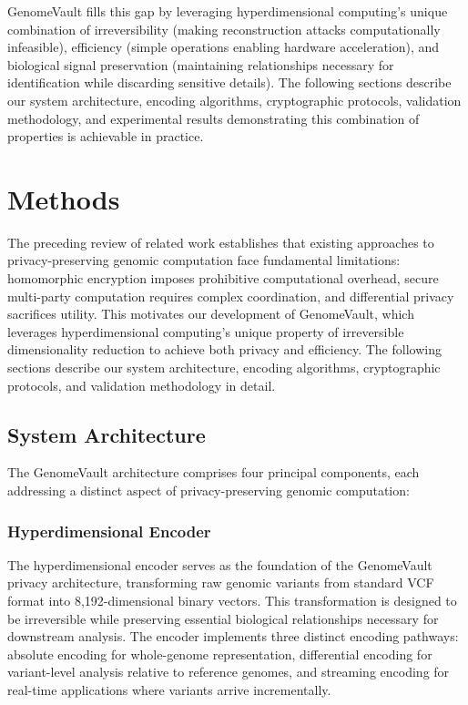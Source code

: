 \documentclass[11pt,letterpaper]{article}
\begin{document}
GenomeVault fills this gap by leveraging hyperdimensional computing's unique combination of irreversibility (making reconstruction attacks computationally infeasible), efficiency (simple operations enabling hardware acceleration), and biological signal preservation (maintaining relationships necessary for identification while discarding sensitive details). The following sections describe our system architecture, encoding algorithms, cryptographic protocols, validation methodology, and experimental results demonstrating this combination of properties is achievable in practice.

\section{Methods}
\label{sec:methods}

The preceding review of related work establishes that existing approaches to privacy-preserving genomic computation face fundamental limitations: homomorphic encryption imposes prohibitive computational overhead, secure multi-party computation requires complex coordination, and differential privacy sacrifices utility. This motivates our development of GenomeVault, which leverages hyperdimensional computing's unique property of irreversible dimensionality reduction to achieve both privacy and efficiency. The following sections describe our system architecture, encoding algorithms, cryptographic protocols, and validation methodology in detail.

\subsection{System Architecture}

The GenomeVault architecture comprises four principal components, each addressing a distinct aspect of privacy-preserving genomic computation:

\subsubsection{Hyperdimensional Encoder}

The hyperdimensional encoder serves as the foundation of the GenomeVault privacy architecture, transforming raw genomic variants from standard VCF format into 8,192-dimensional binary vectors. This transformation is designed to be irreversible while preserving essential biological relationships necessary for downstream analysis. The encoder implements three distinct encoding pathways: absolute encoding for whole-genome representation, differential encoding for variant-level analysis relative to reference genomes, and streaming encoding for real-time applications where variants arrive incrementally.
\end{document}
